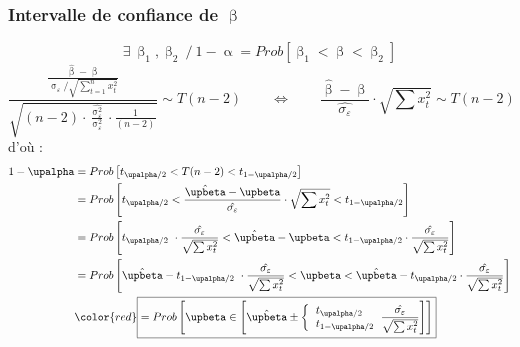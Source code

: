 \documentclass{article}
\newcommand{\hbeta}{\hat{\upbeta}}
\newcommand{\sumt}{\sum\limits_{t=1}^n}
\newcommand{\sig}{\upsigma_\varepsilon^2}
\newcommand{\studn}{t_{\upalpha / 2}}
\newcommand{\studp}{t_{1 - \upalpha / 2}}
\begin{document}
\subsubsection{ Intervalle de confiance de \(\upbeta\)}
\[\exists \: \upbeta_1, \upbeta_2 \: /  \: 1 - \upalpha = Prob [\upbeta_1 < \upbeta < \upbeta_2]\]
\[\frac{\frac{\hbeta - \upbeta}{\upsigma_\varepsilon / \sqrt{\sumt x_t^2}}}{\sqrt{(n-2) \cdot \frac{\hat{\sig}}{\sig} \cdot \frac{1}{(n-2)}}} \sim T(n-2) \qquad \Leftrightarrow \qquad \frac{\hbeta - \upbeta}{\hat{\sigma_\varepsilon}} \cdot \sqrt{\sum x_t^2} \sim T(n-2) \]
d'où : 
\begin{align*}
	1- \upalpha &= Prob\left[\studn < T(n-2) <\studp\right] \\
	&= Prob\left[\studn< \frac{\hbeta - \upbeta}{\hat{\sigma_\varepsilon}} \cdot \sqrt{\sum x_t^2}<\studp\right] \\		&= Prob\left[\studn\ \cdot \frac{\hat{\sigma_\varepsilon}}{\sqrt{\sum x_t^2}} < \hbeta - \upbeta <\studp \cdot \frac{\hat{\sigma_\varepsilon}}{\sqrt{\sum x_t^2}} \right] \\
	&=  Prob\left[\hbeta - \studp\ \cdot \frac{\hat{\sigma_\varepsilon}}{\sqrt{\sum x_t^2}} <\upbeta <\hbeta - \studn \cdot \frac{\hat{\sigma_\varepsilon}}{\sqrt{\sum x_t^2}} \right] \\
	&{\color{red} \boxed{= Prob\left[\upbeta \in \left[\hbeta \pm \bigg\{\begin{tabular}{l} $\studn$ \\ $\studp$ \end{tabular}  \frac{\hat{\sigma_\varepsilon}}{\sqrt{\sum x_t^2}}  \right]\right]}}
\end{align*}
\end{document}
